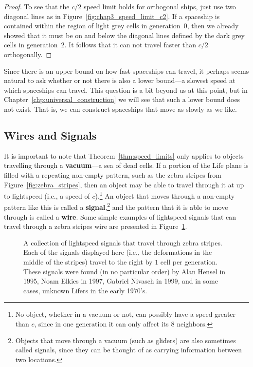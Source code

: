 \begin{proof}
	To see that the $c/2$ speed limit holds for orthogonal ships, just use two diagonal lines as in Figure~\ref{fig:chap3_speed_limit_c2}. If a spaceship is contained within the region of light grey cells in generation~0, then we already showed that it must be on and below the diagonal lines defined by the dark grey cells in generation~2. It follows that it can not travel faster than $c/2$ orthogonally.
\end{proof}

Since there is an upper bound on how fast spaceships can travel, it perhaps seems natural to ask whether or not there is also a lower bound---a slowest speed at which spaceships can travel. This question is a bit beyond us at this point, but in Chapter~\ref{chp:universal_construction} we will see that such a lower bound does not exist. That is, we can construct spaceships that move as slowly as we like.


\subsection{Wires and Signals}\label{sec:wires_signals}

It is important to note that Theorem~\ref{thm:speed_limits} only applies to objects travelling through a \textbf{vacuum}---a sea of dead cells. If a portion of the Life plane is filled with a repeating non-empty pattern, such as the zebra stripes from Figure~\ref{fig:zebra_stripes}, then an object may be able to travel through it at up to lightspeed (i.e., a speed of $c$).\footnote{No object, whether in a vacuum or not, can possibly have a speed greater than $c$, since in one generation it can only affect its $8$ neighbors.} An object that moves through a non-empty pattern like this is called a \textbf{signal},\footnote{Objects that move through a vacuum (such as gliders) are also sometimes called signals, since they can be thought of as carrying information between two locations.} and the pattern that it is able to move through is called a \textbf{wire}. Some simple examples of lightspeed signals that can travel through a zebra stripes wire are presented in Figure~\ref{fig:lightspeed_signals}.

\begin{figure}[!htb]
	\centering{}
	\caption{A collection of lightspeed signals that travel through zebra stripes. Each of the signals displayed here (i.e., the deformations in the middle of the stripes) travel to the right by $1$ cell per generation. These signals were found (in no particular order) by Alan Hensel in 1995, Noam Elkies in 1997, Gabriel Nivasch in 1999, and in some cases, unknown Lifers in the early 1970's.}\label{fig:lightspeed_signals}
\end{figure}


